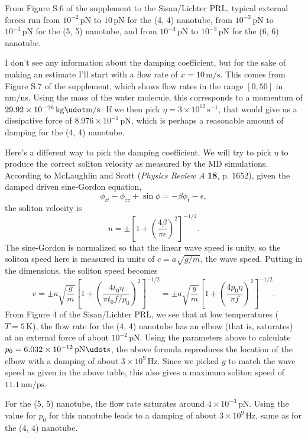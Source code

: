 \documentclass[11pt]{article}
\begin{document}
From Figure S.6 of the supplement to the Sisan/Lichter PRL, typical external forces run from $10^{-2}\,\text{pN}$ to $10\,\text{pN}$ for the (4, 4) nanotube, from $10^{-3}\,\text{pN}$ to $10^{-1}\,\text{pN}$ for the (5, 5) nanotube, and from $10^{-4}\,\text{pN}$ to $10^{-3}\,\text{pN}$ for the (6, 6) nanotube.

I don't see any information about the damping coefficient, but for the sake of making an estimate I'll start with a flow rate of $\dot{x}=10\,\text{m}/\text{s}$. This comes from Figure S.7 of the supplement, which shows flow rates in the range $[0, 50]$ in $\text{nm}/\text{ns}$. Using the mass of the water molecule, this corresponds to a momentum of $29.92\times10^{-26}\,\text{kg}\udot\text{m}/\text{s}$. If we then pick $\eta=3\times10^{12}\,\text{s}^{-1}$, that would give us a dissipative force of $8.976\times10^{-1}\,\text{pN}$, which is perhaps a reasonable amount of damping for the (4, 4) nanotube.

Here's a different way to pick the damping coefficient. We will try to pick $\eta$ to produce the correct soliton velocity as measured by the MD simulations. According to McLaughlin and Scott (\textit{Physics Review A} \textbf{18}, p. 1652), given the damped driven sine-Gordon equation,
\[
\phi_{tt}-\phi_{zz}+\sin\phi=-\beta\phi_t-\epsilon,
\]
the soliton velocity is
\[
u=\pm\left[1+\left(\frac{4\beta}{\pi\epsilon}\right)^2\right]^{-1/2}.
\]
The sine-Gordon is normalized so that the linear wave speed is unity, so the soliton speed here is measured in units of $c=a\sqrt{g/m}$, the wave speed. Putting in the dimensions, the soliton speed becomes
\[
v=\pm a\sqrt{\frac{g}{m}}
	\left[1+\left(\frac{4t_0\eta}{\pi t_0 f/p_0}\right)^2\right]^{-1/2}
	=\pm a\sqrt{\frac{g}{m}}
	\left[1+\left(\frac{4p_0\eta}{\pi f}\right)^2\right]^{-1/2}.
\]
From Figure 4 of the Sisan/Lichter PRL, we see that at low temperatures ($T=5\,\text{K}$), the flow rate for the (4, 4) nanotube has an elbow (that is, saturates) at an external force of about $10^{-2}\,\text{pN}$. Using the parameters above to calculate $p_0=6.032\times10^{-12}\,\text{pN}\udot\text{s}$,  the above formula reproduces the location of the elbow with a damping of about $3\times10^{9}\,\text{Hz}$. Since we picked $g$ to match the wave speed as given in the above table, this also gives a maximum soliton speed of $11.1\,\text{nm}/\text{ps}$.

For the (5, 5) nanotube, the flow rate saturates around $4\times10^{-3}\,\text{pN}$. Using the value for $p_0$ for this nanotube leads to a damping of about $3\times10^9\,\text{Hz}$, same as for the (4, 4) nanotube.
\end{document}
